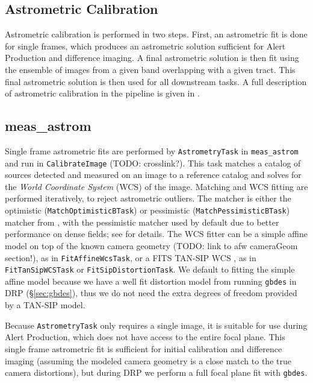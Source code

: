 \subsection{Astrometric Calibration}

Astrometric calibration is performed in two steps.
First, an astrometric fit is done for single frames, which produces an astrometric solution sufficient for Alert Production and difference imaging.
A final astrometric solution is then fit using the ensemble of images from a given band overlapping with a given tract.
This final astrometric solution is then used for all downstream tasks.
A full description of astrometric calibration in the pipeline is given in \citet{DMTN-266}.
\subsection{meas\_astrom}

Single frame astrometric fits are performed by \texttt{AstrometryTask} in \texttt{meas\_astrom} and run in \texttt{CalibrateImage} (TODO: crosslink?).
This task matches a catalog of sources detected and measured on an image to a reference catalog and solves for the \textit{World Coordinate System} (WCS) of the image.
Matching and WCS fitting are performed iteratively, to reject astrometric outliers.
The matcher is either the optimistic (\texttt{MatchOptimisticBTask}) or pessimistic (\texttt{MatchPessimisticBTask}) matcher from \citet{2007PASA...24..189T}, with the pessimistic matcher used by default due to better performance on dense fields; see \citep{DMTN-031} for details.
The WCS fitter can be a simple affine model on top of the known camera geometry (TODO: link to afw cameraGeom section!), as in \texttt{FitAffineWcsTask}, or a FITS TAN-SIP WCS \citep{2005ASPC..347..491S}, as in \texttt{FitTanSipWCSTask} or \texttt{FitSipDistortionTask}.
We default to fitting the simple affine model because we have a well fit distortion model from running \texttt{gbdes} in DRP (\S\ref{sec:gbdes}), thus we do not need the extra degrees of freedom provided by a TAN-SIP model.

Because \texttt{AstrometryTask} only requires a single image, it is suitable for use during Alert Production, which does not have access to the entire focal plane.
This single frame astrometric fit is sufficient for initial calibration and difference imaging (assuming the modeled camera geometry is a close match to the true camera distortions), but during DRP we perform a full focal plane fit with \texttt{gbdes}.

